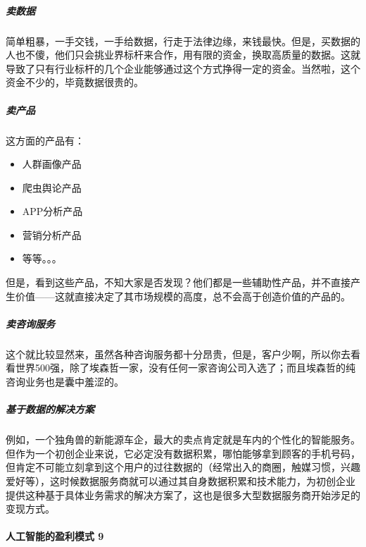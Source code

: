 \documentclass[letterpaper,11pt,english]{sphinxmanual}
\begin{document}
\subparagraph{卖数据}
\label{\detokenize{chapter_introduction/money:id17}}
简单粗暴，一手交钱，一手给数据，行走于法律边缘，来钱最快。但是，买数据的人也不傻，他们只会挑业界标杆来合作，用有限的资金，换取高质量的数据。这就导致了只有行业标杆的几个企业能够通过这个方式挣得一定的资金。当然啦，这个资金不少的，毕竟数据很贵的。


\subparagraph{卖产品}
\label{\detokenize{chapter_introduction/money:id18}}
这方面的产品有：
\begin{itemize}
\item {} 
人群画像产品

\item {} 
爬虫舆论产品

\item {} 
APP分析产品

\item {} 
营销分析产品

\item {} 
等等。。。

\end{itemize}

但是，看到这些产品，不知大家是否发现？他们都是一些辅助性产品，并不直接产生价值——这就直接决定了其市场规模的高度，总不会高于创造价值的产品的。


\subparagraph{卖咨询服务}
\label{\detokenize{chapter_introduction/money:id19}}
这个就比较显然来，虽然各种咨询服务都十分昂贵，但是，客户少啊，所以你去看看世界500强，除了埃森哲一家，没有任何一家咨询公司入选了；而且埃森哲的纯咨询业务也是囊中羞涩的。


\subparagraph{基于数据的解决方案}
\label{\detokenize{chapter_introduction/money:id20}}
例如，一个独角兽的新能源车企，最大的卖点肯定就是车内的个性化的智能服务。但作为一个初创企业来说，它必定没有数据积累，哪怕能够拿到顾客的手机号码，但肯定不可能立刻拿到这个用户的过往数据的（经常出入的商圈，触媒习惯，兴趣爱好等），这时候数据服务商就可以通过其自身数据积累和技术能力，为初创企业提供这种基于具体业务需求的解决方案了，这也是很多大型数据服务商开始涉足的变现方式。


\paragraph{人工智能的盈利模式 9\sphinxfootnotemark[117]}
\label{\detokenize{chapter_introduction/money:id21}}%
\begin{footnotetext}[117]\sphinxAtStartFootnote
{}
%
\end{footnotetext}\ignorespaces 
\end{document}
